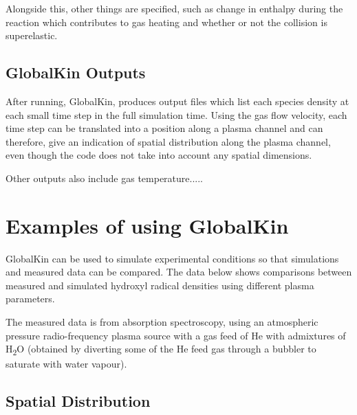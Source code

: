 \documentclass[11pt, oneside]{article}   	%
\begin{document}
Alongside this, other things are specified, such as change in enthalpy during the reaction which contributes to gas heating and whether or not the collision is superelastic.


\subsection{GlobalKin Outputs}
After running, GlobalKin, produces output files which list each species density at each small time step in the full simulation time.
Using the gas flow velocity, each time step can be translated into a position along a plasma channel and can therefore, give an indication of spatial distribution along the plasma channel, even though the code does not take into account any spatial dimensions.

Other outputs also include gas temperature.....






\section{Examples of using GlobalKin}
GlobalKin can be used to simulate experimental conditions so that simulations and measured data can be compared.
The data below shows comparisons between measured and simulated hydroxyl radical densities using different plasma parameters.

The measured data is from absorption spectroscopy, using an atmospheric pressure radio-frequency plasma source with a gas feed of He with admixtures of H\textsubscript{2}O (obtained by diverting some of the He feed gas through a bubbler to saturate with water vapour).

\subsection{Spatial Distribution}
\end{document}
